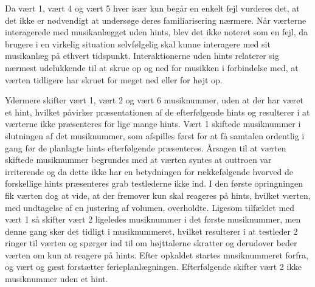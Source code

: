 Da vært 1, vært 4 og vært 5 hver især kun begår en enkelt fejl vurderes det, at det ikke er nødvendigt at undersøge deres familiarisering nærmere.\blankline
%
Når værterne interagerede med musikanlægget uden hints, blev det ikke noteret som en fejl, da brugere i en virkelig situation selvfølgelig skal kunne interagere med sit musikanlæg på ethvert tidspunkt. Interaktionerne uden hints relaterer sig nærmest udelukkende til at skrue op og ned for musikken i forbindelse med, at værten tidligere har skruet for meget ned eller for højt op. 

Ydermere skifter vært 1, vært 2 og vært 6 musiknummer, uden at der har været et hint, hvilket påvirker præsentationen af de efterfølgende hints og resulterer i at værterne ikke præsenteres for lige mange hints. Vært 1 skiftede musiknummer i slutningen af det musiknummer, som afspilles først for at få samtalen ordentlig i gang før de planlagte hints efterfølgende præsenteres. Årsagen til at værten skiftede musiknummer begrundes med at værten syntes at outtroen var irriterende og da dette ikke har en betydningen for rækkefølgende hvorved de forskellige hints præsenteres grab testlederne ikke ind. I den første opringningen fik værten dog at vide, at der fremover kun skal reageres på hints, hvilket værten, med undtagelse af en justering af volumen, overholdte. Ligesom tilfældet med vært 1 så skifter vært 2 ligeledes musiknummer i det første musiknummer, men denne gang sker det tidligt i musiknummeret, hvilket resulterer i at testleder 2 ringer til værten og spørger ind til om højttalerne skratter og derudover beder værten om kun at reagere på hints. Efter opkaldet startes musiknummeret forfra, og vært og gæst forstætter ferieplanlægningen. Efterfølgende skifter vært 2 ikke musiknummer uden et hint.    

